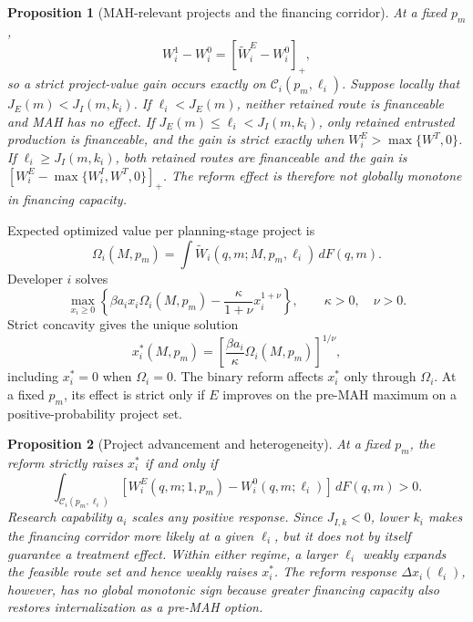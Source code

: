 \documentclass[12pt]{article}
\newtheorem{proposition}{Proposition}
\newcommand{\1}{\mathbf{1}}
\begin{document}
\begin{proposition}[MAH-relevant projects and the financing corridor]
\label{prop:main-financing-corridor}
At a fixed \(p_m\),
\begin{equation}
  W_i^1-W_i^0
  =
  [\widetilde W_i^E-W_i^0]_+,
  \label{eq:p16m-positive-part}
\end{equation}
so a strict project-value gain occurs exactly on
\(\mathcal C_i(p_m,\ell_i)\). Suppose locally that
\(J_E(m)<J_I(m,k_i)\). If \(\ell_i<J_E(m)\), neither retained route is
financeable and MAH has no effect. If
\(J_E(m)\leq\ell_i<J_I(m,k_i)\), only retained entrusted production is
financeable, and the gain is strict exactly when
\(W_i^E>\max\{W^T,0\}\). If \(\ell_i\geq J_I(m,k_i)\), both retained routes
are financeable and the gain is
\([W_i^E-\max\{W_i^I,W^T,0\}]_+\). The reform effect is therefore not
globally monotone in financing capacity.
\end{proposition}

Expected optimized value per planning-stage project is
\begin{equation}
  \Omega_i(M,p_m)
  =
  \int \widetilde W_i(q,m;M,p_m,\ell_i)\,dF(q,m).
  \label{eq:p16m-omega}
\end{equation}
Developer \(i\) solves
\begin{equation}
  \max_{x_i\geq0}
  \left\{
  \beta a_ix_i\Omega_i(M,p_m)
  -
  \frac{\kappa}{1+\nu}x_i^{1+\nu}
  \right\},
  \qquad \kappa>0,\quad \nu>0.
  \label{eq:p16m-advancement-problem}
\end{equation}
Strict concavity gives the unique solution
\begin{equation}
  x_i^*(M,p_m)
  =
  \left[
  \frac{\beta a_i}{\kappa}\Omega_i(M,p_m)
  \right]^{1/\nu},
  \label{eq:p16m-advancement}
\end{equation}
including \(x_i^*=0\) when \(\Omega_i=0\). The binary reform affects
\(x_i^*\) only through \(\Omega_i\). At a fixed \(p_m\), its effect is
strict only if \(E\) improves on the pre-MAH maximum on a
positive-probability project set.

\begin{proposition}[Project advancement and heterogeneity]
\label{prop:main-finance-advancement}
At a fixed \(p_m\), the reform strictly raises \(x_i^*\) if and only if
\begin{equation}
  \int_{\mathcal C_i(p_m,\ell_i)}
  [W_i^E(q,m;1,p_m)-W_i^0(q,m;\ell_i)]\,dF(q,m)>0.
  \label{eq:p16m-strict-advancement}
\end{equation}
Research capability \(a_i\) scales any positive response. Since
\(J_{I,k}<0\), lower \(k_i\) makes the financing corridor more likely at a
given \(\ell_i\), but it does not by itself guarantee a treatment effect.
Within either regime, a larger \(\ell_i\) weakly expands the feasible route
set and hence weakly raises \(x_i^*\). The reform response
\(\Delta x_i(\ell_i)\), however, has no global monotonic sign because greater
financing capacity also restores internalization as a pre-MAH option.
\end{proposition}
\end{document}
